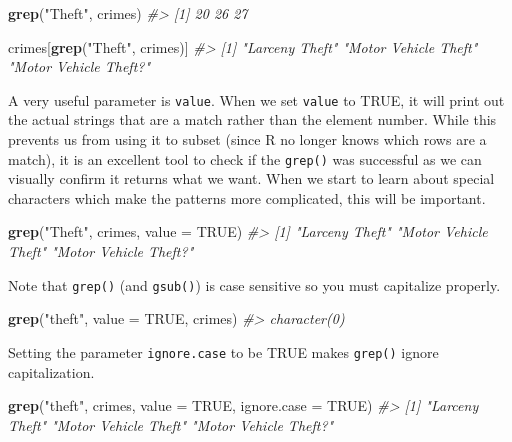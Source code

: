 \documentclass[
  12pt,
]{book}
\newenvironment{Shaded}{\begin{snugshade}}{\end{snugshade}}
\newcommand{\CommentTok}[1]{\textcolor[rgb]{0.37,0.37,0.37}{\textit{#1}}}
\newcommand{\DataTypeTok}[1]{\textcolor[rgb]{0.27,0.27,0.27}{#1}}
\newcommand{\KeywordTok}[1]{\textcolor[rgb]{0.27,0.27,0.27}{\textbf{#1}}}
\newcommand{\NormalTok}[1]{#1}
\newcommand{\OtherTok}[1]{\textcolor[rgb]{0.37,0.37,0.37}{#1}}
\newcommand{\StringTok}[1]{\textcolor[rgb]{0.5,0.5,0.5}{#1}}
\begin{document}
\begin{Shaded}
\begin{Highlighting}[]
\KeywordTok{grep}\NormalTok{(}\StringTok{"Theft"}\NormalTok{, crimes)}
\CommentTok{\#> [1] 20 26 27}
\end{Highlighting}
\end{Shaded}

\begin{Shaded}
\begin{Highlighting}[]
\NormalTok{crimes[}\KeywordTok{grep}\NormalTok{(}\StringTok{"Theft"}\NormalTok{, crimes)]}
\CommentTok{\#> [1] "Larceny Theft"        "Motor Vehicle Theft"  "Motor Vehicle Theft?"}
\end{Highlighting}
\end{Shaded}

A very useful parameter is \texttt{value}. When we set \texttt{value} to TRUE, it will print out the actual strings that are a match rather than the element number. While this prevents us from using it to subset (since R no longer knows which rows are a match), it is an excellent tool to check if the \texttt{grep()} was successful as we can visually confirm it returns what we want. When we start to learn about special characters which make the patterns more complicated, this will be important.

\begin{Shaded}
\begin{Highlighting}[]
\KeywordTok{grep}\NormalTok{(}\StringTok{"Theft"}\NormalTok{, crimes, }\DataTypeTok{value =} \OtherTok{TRUE}\NormalTok{)}
\CommentTok{\#> [1] "Larceny Theft"        "Motor Vehicle Theft"  "Motor Vehicle Theft?"}
\end{Highlighting}
\end{Shaded}

Note that \texttt{grep()} (and \texttt{gsub()}) is case sensitive so you must capitalize properly.

\begin{Shaded}
\begin{Highlighting}[]
\KeywordTok{grep}\NormalTok{(}\StringTok{"theft"}\NormalTok{, }\DataTypeTok{value =} \OtherTok{TRUE}\NormalTok{, crimes)}
\CommentTok{\#> character(0)}
\end{Highlighting}
\end{Shaded}

Setting the parameter \texttt{ignore.case} to be TRUE makes \texttt{grep()} ignore capitalization.

\begin{Shaded}
\begin{Highlighting}[]
\KeywordTok{grep}\NormalTok{(}\StringTok{"theft"}\NormalTok{, crimes, }\DataTypeTok{value =} \OtherTok{TRUE}\NormalTok{, }\DataTypeTok{ignore.case =} \OtherTok{TRUE}\NormalTok{)}
\CommentTok{\#> [1] "Larceny Theft"        "Motor Vehicle Theft"  "Motor Vehicle Theft?"}
\end{Highlighting}
\end{Shaded}
\end{document}
